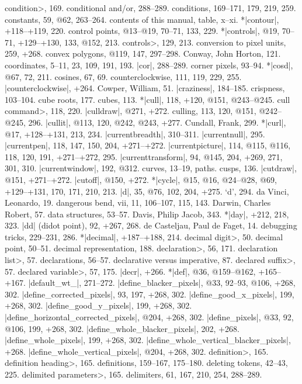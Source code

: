 \<condition>, 169.
conditional and/or, 288--289.
conditions, 169--171, 179, 219, 259.
constants, 59, @62, 263--264.
contents of this manual, table, x--xi.
*|contour|, +118--+119, 220.
control points, @13--@19, 70--71, 133, 229.
*|controls|, @19, 70--71, +129--+130, 133, @152, 213.
\<controls>, 129, 213.
conversion to pixel units, 259, +268.
convex polygons, @119, 147, 297--298.
Conway, John Horton, 121.
coordinates, 5--11, 23, 109, 191, 193.
|cor|, 288--289.
corner pixels, 93--94.
*|cosd|, @67, 72, 211.
cosines, 67, 69.
counterclockwise, 111, 119, 229, 255.
|counterclockwise|, +264.
Cowper, William, 51.
|craziness|, 184--185.
crispness, 103--104.
cube roots, 177.
cubes, 113.
*|cull|, 118, +120, @151, @243--@245.
\<cull command>, 118, 220.
|culldraw|, @271, +272.
culling, 113, 120, @151, @242--@245, 296.
|cullit|, @113, 120, @242, @243, +277.
Cundall, Frank, 299.
*|curl|, @17, +128--+131, 213, 234.
|currentbreadth|, 310--311.
|currentnull|, 295.
|currentpen|, 118, 147, 150, 204, +271--+272.
|currentpicture|, 114, @115, @116, 118, 120, 191, +271--+272, 295.
|currenttransform|, 94, @145, 204, +269, 271, 301, 310.
|currentwindow|, 192, @312.
curves, 13--19, \see paths.
cusps, 136.
|cutdraw|, @151, +271--+272.
|cutoff|, @150, +272.
*|cycle|, @15, @16, @24--@28, @69, +129--+131, 170, 171, 210, 213.
\newletter
|d|, 35, @76, 102, 204, +275.
`d', 294.
da Vinci, Leonardo, 19.
dangerous bend, vii, 11, 106--107, 115, 143.
Darwin, Charles Robert, 57.
data structures, 53--57.
Davis, Philip Jacob, 343.
*|day|, +212, 218, 323.
|dd| (didot point), 92, +267, 268.
de Casteljau, Paul de Faget, 14.
debugging tricks, 229--231, 286.
*|decimal|, +187--+188, 214.
\<decimal digit>, 50.
decimal point, 50--51.
decimal representation, 188.
\<declaration>, 56, 171.
\<declaration list>, 57.
declarations, 56--57.
declarative versus imperative, 87.
\<declared suffix>, 57.
\<declared variable>, 57, 175.
|decr|, +266.
*|def|, @36, @159--@162, +165--+167.
|default_wt_|, 271--272.
|define_blacker_pixels|, @33, 92--93, @106, +268, 302.
|define_corrected_pixels|, 93, 197, +268, 302.
|define_good_x_pixels|, 199, +268, 302.
|define_good_y_pixels|, 199, +268, 302.
|define_horizontal_corrected_pixels|, @204, +268, 302.
|define_pixels|, @33, 92, @106, 199, +268, 302.
|define_whole_blacker_pixels|, 202, +268.
|define_whole_pixels|, 199, +268, 302.
|define_whole_vertical_blacker_pixels|, +268.
|define_whole_vertical_pixels|, @204, +268, 302.
\<definition>, 165.
\<definition heading>, 165.
definitions, 159--167, 175--180.
deleting tokens, 42--43, 225.
\<delimited parameters>, 165.
delimiters, 61, 167, 210, 254, 288--289.
